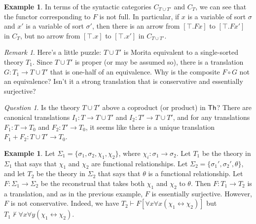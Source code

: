 \documentclass[12pt]{article}
\theoremstyle{definition}
\newtheorem{example}[prop]{Example}
\theoremstyle{remark}
\newtheorem*{note}{Remark}
\newtheorem*{question}{Question}
\newcommand{\3}{\mathcal}
\begin{document}
\begin{example}
  In terms of the syntactic categories $C_{T\cup T'}$ and $C_{T}$,
  we can see that the functor corresponding to $F$ is not full. In
  particular, if $x$ is a variable of sort $\sigma$ and $x'$ is a
  variable of sort $\sigma '$, then there is an arrow from
  $[\top .Fx]$ to $[\top .Fx']$ in $C_{T}$, but no arrow from
  $[\top .x]$ to $[\top .x']$ in $C_{T\cup T'}$.  \end{example}

\begin{note} Here's a little puzzle: $T\cup T'$ is Morita equivalent
  to a single-sorted theory $T_1$.  Since $T\cup T'$ is proper (or may
  be assumed so), there is a translation $G:T_1\to T\cup T'$ that is
  one-half of an equivalence. Why is the composite $F\circ G$ not an
  equivalence? Isn't it a strong translation that is conservative and
  essentially surjective? \end{note}

\begin{question} Is the theory $T\cup T'$ above a coproduct (or
  product) in $\mathsf{Th}$? There are canonical translations
  $I_1:T\to T\cup T'$ and $I_2:T'\to T\cup T'$, and for any
  translations $F_1:T\to T_0$ and $F_2:T'\to T_0$, it seems like there
  is a unique translation $F_1+F_2:T\cup T'\to T_0$. \end{question}

\begin{example} Let
  $\Sigma _1 = \{ \sigma _1,\sigma _2,\chi _1,\chi _2\}$, where
  $\chi _i:\sigma _1\to \sigma _2$. Let $T_1$ be the theory in
  $\Sigma _1$ that says that $\chi _1$ and $\chi _2$ are functional
  relationships. Let $\Sigma _2 =\{ \sigma _1',\sigma _2',\theta \}$,
  and let $T_2$ be the theory in $\Sigma _2$ that says that $\theta$
  is a functional relationship. Let $F:\Sigma _1\to \Sigma _2$ be the
  reconstrual that takes both $\chi _1$ and $\chi _2$ to
  $\theta$. Then $F:T_1\to T_2$ is a translation, and as in the
  previous example, $F$ is essentially surjective. However, $F$ is not
  conservative. Indeed, we have
  $T_2\vdash F[\forall x\forall x(\chi _1\leftrightarrow \chi _2)]$
  but
  $T_1\not\vdash \forall x\forall y(\chi _1\leftrightarrow \chi _2)$.
\end{example}
\end{document}
